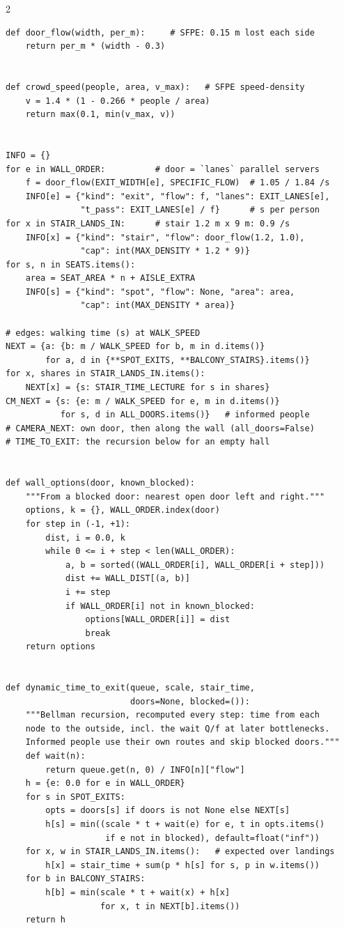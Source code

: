 \documentclass[10pt]{article}
\begin{document}
\begin{multicols*}{2}
\begin{lstlisting}
def door_flow(width, per_m):     # SFPE: 0.15 m lost each side
    return per_m * (width - 0.3)


def crowd_speed(people, area, v_max):   # SFPE speed-density
    v = 1.4 * (1 - 0.266 * people / area)
    return max(0.1, min(v_max, v))


INFO = {}
for e in WALL_ORDER:          # door = `lanes` parallel servers
    f = door_flow(EXIT_WIDTH[e], SPECIFIC_FLOW)  # 1.05 / 1.84 /s
    INFO[e] = {"kind": "exit", "flow": f, "lanes": EXIT_LANES[e],
               "t_pass": EXIT_LANES[e] / f}      # s per person
for x in STAIR_LANDS_IN:      # stair 1.2 m x 9 m: 0.9 /s
    INFO[x] = {"kind": "stair", "flow": door_flow(1.2, 1.0),
               "cap": int(MAX_DENSITY * 1.2 * 9)}
for s, n in SEATS.items():
    area = SEAT_AREA * n + AISLE_EXTRA
    INFO[s] = {"kind": "spot", "flow": None, "area": area,
               "cap": int(MAX_DENSITY * area)}

# edges: walking time (s) at WALK_SPEED
NEXT = {a: {b: m / WALK_SPEED for b, m in d.items()}
        for a, d in {**SPOT_EXITS, **BALCONY_STAIRS}.items()}
for x, shares in STAIR_LANDS_IN.items():
    NEXT[x] = {s: STAIR_TIME_LECTURE for s in shares}
CM_NEXT = {s: {e: m / WALK_SPEED for e, m in d.items()}
           for s, d in ALL_DOORS.items()}   # informed people
# CAMERA_NEXT: own door, then along the wall (all_doors=False)
# TIME_TO_EXIT: the recursion below for an empty hall


def wall_options(door, known_blocked):
    """From a blocked door: nearest open door left and right."""
    options, k = {}, WALL_ORDER.index(door)
    for step in (-1, +1):
        dist, i = 0.0, k
        while 0 <= i + step < len(WALL_ORDER):
            a, b = sorted((WALL_ORDER[i], WALL_ORDER[i + step]))
            dist += WALL_DIST[(a, b)]
            i += step
            if WALL_ORDER[i] not in known_blocked:
                options[WALL_ORDER[i]] = dist
                break
    return options


def dynamic_time_to_exit(queue, scale, stair_time,
                         doors=None, blocked=()):
    """Bellman recursion, recomputed every step: time from each
    node to the outside, incl. the wait Q/f at later bottlenecks.
    Informed people use their own routes and skip blocked doors."""
    def wait(n):
        return queue.get(n, 0) / INFO[n]["flow"]
    h = {e: 0.0 for e in WALL_ORDER}
    for s in SPOT_EXITS:
        opts = doors[s] if doors is not None else NEXT[s]
        h[s] = min((scale * t + wait(e) for e, t in opts.items()
                    if e not in blocked), default=float("inf"))
    for x, w in STAIR_LANDS_IN.items():   # expected over landings
        h[x] = stair_time + sum(p * h[s] for s, p in w.items())
    for b in BALCONY_STAIRS:
        h[b] = min(scale * t + wait(x) + h[x]
                   for x, t in NEXT[b].items())
    return h



\end{lstlisting}
\end{multicols*}
\end{document}

